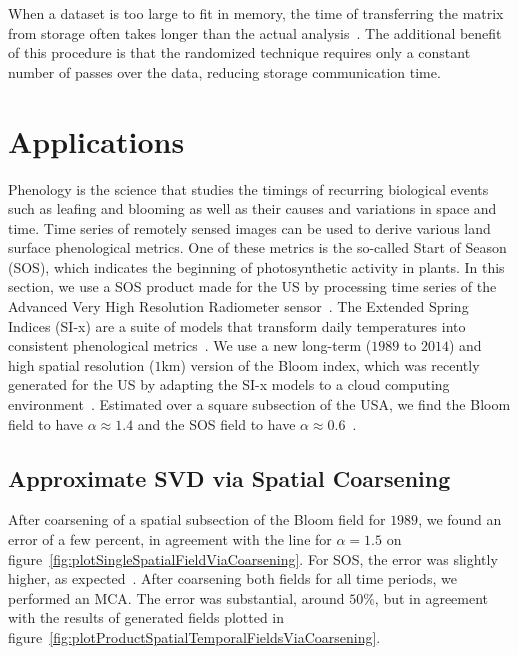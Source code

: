 \documentclass{acm_proc_article-sp}
\begin{document}
When a dataset is too large to fit in memory, the time of transferring the matrix from storage often takes longer than the actual analysis~\cite{Halko2011}. The additional benefit of this procedure is that the randomized technique requires only a constant number of passes over the data, reducing storage communication time.

\section{Applications}
\label{sec:Applications}

Phenology is the science that studies the timings of recurring biological events such as leafing and blooming as well as their causes and variations in space and time. Time series of remotely sensed images can be used to derive various land surface phenological metrics. One of these metrics is the so-called Start of Season (SOS), which indicates the beginning of photosynthetic activity in plants. In this section, we use a SOS product made for the US by processing time series of the Advanced Very High Resolution Radiometer sensor~\cite{Reed1994}. The Extended Spring Indices (SI-x) are a suite of models that transform daily temperatures into consistent phenological metrics~\cite{Schwartz2013}. We use a new long-term ($1989$ to $2014$) and high spatial resolution ($1$km) version of the Bloom index, which was recently generated for the US by adapting the SI-x models to a cloud computing environment~\cite{Izquierdo2015}. Estimated over a square subsection of the USA, we find the Bloom field to have $\alpha \approx 1.4$ and the SOS field to have $\alpha \approx 0.6$~\cite{Bogaardt2018}.

\subsection{Approximate SVD via Spatial Coarsening}
\label{sec:Applications Approximate SVD via Spatial Coarsening}

After coarsening of a spatial subsection of the Bloom field for $1989$, we found an error of a few percent, in agreement with the line for $\alpha = 1.5$ on figure~\ref{fig:plotSingleSpatialFieldViaCoarsening}. For SOS, the error was slightly higher, as expected~\cite{Bogaardt2018}. After coarsening both fields for all time periods, we performed an MCA. The error was substantial, around $50\%$, but in agreement with the results of generated fields plotted in figure~\ref{fig:plotProductSpatialTemporalFieldsViaCoarsening}.
\end{document}
